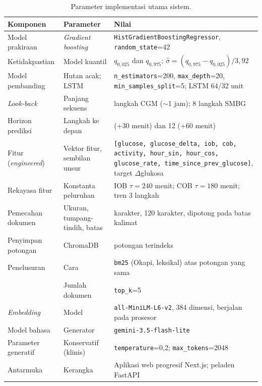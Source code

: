 \begin{table}[htbp]
\centering
\caption{Parameter implementasi utama sistem.}
\label{tab:parameter-implementasi}
\small
\begin{tabular}{@{}>{\raggedright\arraybackslash}p{3.3cm}>{\raggedright\arraybackslash}p{3.9cm}>{\raggedright\arraybackslash}p{5.3cm}@{}}
\toprule
\textbf{Komponen} & \textbf{Parameter} & \textbf{Nilai} \\
\midrule
Model prakiraan & \emph{Gradient boosting} & \texttt{Hist\allowbreak Gradient\allowbreak Boosting\allowbreak Regressor}, \texttt{random\_\allowbreak state}=42 \\[2pt]
Ketidakpastian & Model kuantil & $q_{0{,}025}$ dan $q_{0{,}975}$; $\hat{\sigma}=(q_{0{,}975}-q_{0{,}025})/3{,}92$ \\[2pt]
Model pembanding & Hutan acak; LSTM & \texttt{n\_\allowbreak estimators}=200, \texttt{max\_\allowbreak depth}=20, \texttt{min\_\allowbreak samples\_\allowbreak split}=5; LSTM 64/32 unit \\[2pt]
\emph{Look-back} & Panjang sekuens & 12 langkah CGM ($\sim$1 jam); 8 langkah SMBG \\[2pt]
Horizon prediksi & Langkah ke depan & 6 ($+30$ menit) dan 12 ($+60$ menit) \\[2pt]
Fitur (\emph{engineered}) & Vektor fitur, sembilan unsur & \texttt{[glucose, glucose\_\allowbreak delta, iob, cob, activity, hour\_\allowbreak sin, hour\_\allowbreak cos, glucose\_\allowbreak rate, time\_\allowbreak since\_\allowbreak prev\_\allowbreak glucose]}, target $\Delta$glukosa \\[2pt]
Rekayasa fitur & Konstanta peluruhan & IOB $\tau=240$ menit; COB $\tau=180$ menit; tren 3 langkah \\[2pt]
Pemecahan dokumen & Ukuran, tumpang-tindih, batas & 900 karakter, 120 karakter, dipotong pada batas kalimat \\[2pt]
Penyimpan potongan & ChromaDB & 2.233 potongan terindeks \\[2pt]
Penelusuran & Cara & \texttt{bm25} (Okapi, leksikal) atas potongan yang sama \\[2pt]
& Jumlah dokumen & \texttt{top\_\allowbreak k}=5 \\[2pt]
\emph{Embedding} & Model & \texttt{all-MiniLM-L6-v2}, 384 dimensi, berjalan pada prosesor \\[2pt]
Model bahasa & Generator & \texttt{gemini-3.5-flash-lite} \\[2pt]
Parameter generatif & Konservatif (klinis) & \texttt{temperature}=0,2; \texttt{max\_\allowbreak tokens}=2048 \\[2pt]
Antarmuka & Kerangka & Aplikasi web progresif Next.js; peladen FastAPI \\
\bottomrule
\end{tabular}


\end{table}

